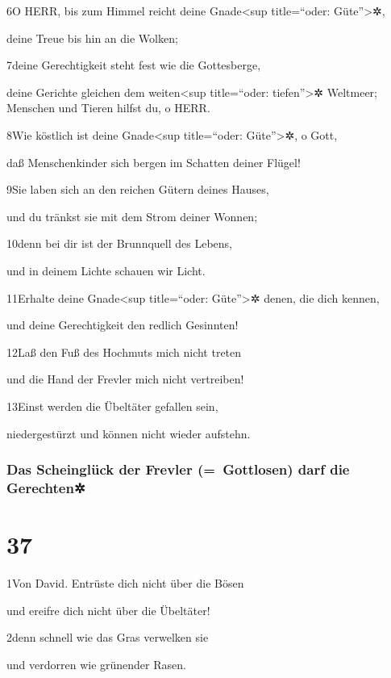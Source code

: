 6O HERR, bis zum Himmel reicht deine Gnade\textless sup title=``oder:
Güte''\textgreater✲,

deine Treue bis hin an die Wolken;

7deine Gerechtigkeit steht fest wie die Gottesberge,

deine Gerichte gleichen dem weiten\textless sup title=``oder:
tiefen''\textgreater✲ Weltmeer; Menschen und Tieren hilfst du, o HERR.

8Wie köstlich ist deine Gnade\textless sup title=``oder:
Güte''\textgreater✲, o Gott,

daß Menschenkinder sich bergen im Schatten deiner Flügel!

9Sie laben sich an den reichen Gütern deines Hauses,

und du tränkst sie mit dem Strom deiner Wonnen;

10denn bei dir ist der Brunnquell des Lebens,

und in deinem Lichte schauen wir Licht.

11Erhalte deine Gnade\textless sup title=``oder: Güte''\textgreater✲
denen, die dich kennen,

und deine Gerechtigkeit den redlich Gesinnten!

12Laß den Fuß des Hochmuts mich nicht treten

und die Hand der Frevler mich nicht vertreiben!

13Einst werden die Übeltäter gefallen sein,

niedergestürzt und können nicht wieder aufstehn.

\hypertarget{das-scheingluxfcck-der-frevler-gottlosen-darf-die-gerechten}{%
\subsubsection{Das Scheinglück der Frevler (=~Gottlosen) darf die
Gerechten✲}\label{das-scheingluxfcck-der-frevler-gottlosen-darf-die-gerechten}}

\hypertarget{section-36}{%
\section{37}\label{section-36}}

1Von David. Entrüste dich nicht über die Bösen

und ereifre dich nicht über die Übeltäter!

2denn schnell wie das Gras verwelken sie

und verdorren wie grünender Rasen.


